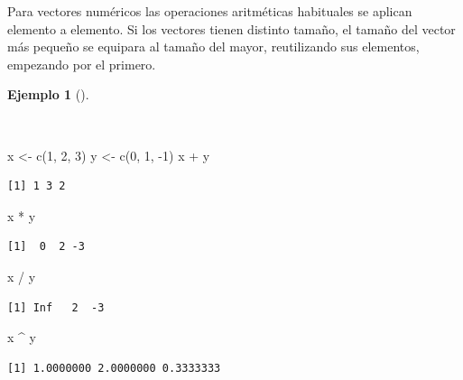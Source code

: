 \documentclass[
  spanish,
  a4paper,
]{scrreport}
\newenvironment{Shaded}{\begin{snugshade}}{\end{snugshade}}
\newcommand{\DecValTok}[1]{\textcolor[rgb]{0.68,0.00,0.00}{#1}}
\newcommand{\FunctionTok}[1]{\textcolor[rgb]{0.28,0.35,0.67}{#1}}
\newcommand{\NormalTok}[1]{\textcolor[rgb]{0.00,0.23,0.31}{#1}}
\newcommand{\OtherTok}[1]{\textcolor[rgb]{0.00,0.23,0.31}{#1}}
\newcommand{\SpecialCharTok}[1]{\textcolor[rgb]{0.37,0.37,0.37}{#1}}
\theoremstyle{definition}
\theoremstyle{definition}
\newtheorem{example}{Ejemplo}[chapter]
\theoremstyle{remark}
\begin{document}
Para vectores numéricos las operaciones aritméticas habituales se
aplican elemento a elemento. Si los vectores tienen distinto tamaño, el
tamaño del vector más pequeño se equipara al tamaño del mayor,
reutilizando sus elementos, empezando por el primero.

\begin{example}[]\protect\hypertarget{exm-operaciones-aritmeticas-vectores}{}\label{exm-operaciones-aritmeticas-vectores}

~

\begin{Shaded}
\begin{Highlighting}[]
\NormalTok{x }\OtherTok{\textless{}{-}} \FunctionTok{c}\NormalTok{(}\DecValTok{1}\NormalTok{, }\DecValTok{2}\NormalTok{, }\DecValTok{3}\NormalTok{)}
\NormalTok{y }\OtherTok{\textless{}{-}} \FunctionTok{c}\NormalTok{(}\DecValTok{0}\NormalTok{, }\DecValTok{1}\NormalTok{, }\SpecialCharTok{{-}}\DecValTok{1}\NormalTok{)}
\NormalTok{x }\SpecialCharTok{+}\NormalTok{ y}
\end{Highlighting}
\end{Shaded}

\begin{verbatim}
[1] 1 3 2
\end{verbatim}

\begin{Shaded}
\begin{Highlighting}[]
\NormalTok{x }\SpecialCharTok{*}\NormalTok{ y}
\end{Highlighting}
\end{Shaded}

\begin{verbatim}
[1]  0  2 -3
\end{verbatim}

\begin{Shaded}
\begin{Highlighting}[]
\NormalTok{x }\SpecialCharTok{/}\NormalTok{ y}
\end{Highlighting}
\end{Shaded}

\begin{verbatim}
[1] Inf   2  -3
\end{verbatim}

\begin{Shaded}
\begin{Highlighting}[]
\NormalTok{x }\SpecialCharTok{\^{}}\NormalTok{ y}
\end{Highlighting}
\end{Shaded}

\begin{verbatim}
[1] 1.0000000 2.0000000 0.3333333
\end{verbatim}

\end{example}
\end{document}
